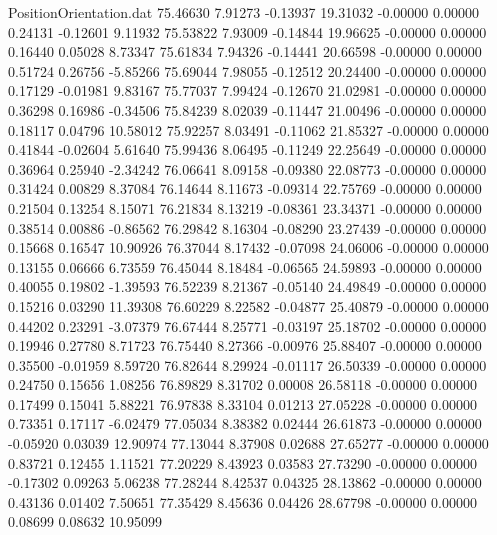 \begin{filecontents}{PositionOrientation.dat}
  75.46630    7.91273   -0.13937    19.31032   -0.00000    0.00000    0.24131   -0.12601    9.11932
  75.53822    7.93009   -0.14844    19.96625   -0.00000    0.00000    0.16440    0.05028    8.73347
  75.61834    7.94326   -0.14441    20.66598   -0.00000    0.00000    0.51724    0.26756   -5.85266
  75.69044    7.98055   -0.12512    20.24400   -0.00000    0.00000    0.17129   -0.01981    9.83167
  75.77037    7.99424   -0.12670    21.02981   -0.00000    0.00000    0.36298    0.16986   -0.34506
  75.84239    8.02039   -0.11447    21.00496   -0.00000    0.00000    0.18117    0.04796   10.58012
  75.92257    8.03491   -0.11062    21.85327   -0.00000    0.00000    0.41844   -0.02604    5.61640
  75.99436    8.06495   -0.11249    22.25649   -0.00000    0.00000    0.36964    0.25940   -2.34242
  76.06641    8.09158   -0.09380    22.08773   -0.00000    0.00000    0.31424    0.00829    8.37084
  76.14644    8.11673   -0.09314    22.75769   -0.00000    0.00000    0.21504    0.13254    8.15071
  76.21834    8.13219   -0.08361    23.34371   -0.00000    0.00000    0.38514    0.00886   -0.86562
  76.29842    8.16304   -0.08290    23.27439   -0.00000    0.00000    0.15668    0.16547   10.90926
  76.37044    8.17432   -0.07098    24.06006   -0.00000    0.00000    0.13155    0.06666    6.73559
  76.45044    8.18484   -0.06565    24.59893   -0.00000    0.00000    0.40055    0.19802   -1.39593
  76.52239    8.21367   -0.05140    24.49849   -0.00000    0.00000    0.15216    0.03290   11.39308
  76.60229    8.22582   -0.04877    25.40879   -0.00000    0.00000    0.44202    0.23291   -3.07379
  76.67444    8.25771   -0.03197    25.18702   -0.00000    0.00000    0.19946    0.27780    8.71723
  76.75440    8.27366   -0.00976    25.88407   -0.00000    0.00000    0.35500   -0.01959    8.59720
  76.82644    8.29924   -0.01117    26.50339   -0.00000    0.00000    0.24750    0.15656    1.08256
  76.89829    8.31702    0.00008    26.58118   -0.00000    0.00000    0.17499    0.15041    5.88221
  76.97838    8.33104    0.01213    27.05228   -0.00000    0.00000    0.73351    0.17117   -6.02479
  77.05034    8.38382    0.02444    26.61873   -0.00000    0.00000   -0.05920    0.03039   12.90974
  77.13044    8.37908    0.02688    27.65277   -0.00000    0.00000    0.83721    0.12455    1.11521
  77.20229    8.43923    0.03583    27.73290   -0.00000    0.00000   -0.17302    0.09263    5.06238
  77.28244    8.42537    0.04325    28.13862   -0.00000    0.00000    0.43136    0.01402    7.50651
  77.35429    8.45636    0.04426    28.67798   -0.00000    0.00000    0.08699    0.08632   10.95099

\end{filecontents}
